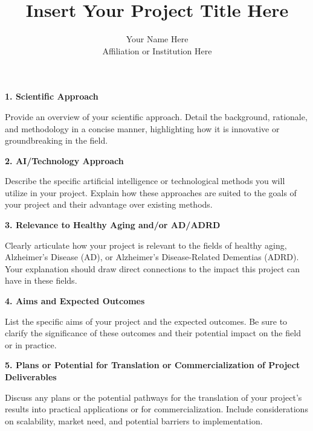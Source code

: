 \documentclass[11pt]{article}
\title{Insert Your Project Title Here}
\author{Your Name Here \\ Affiliation or Institution Here}
\date{}
\begin{document}
\maketitle
\thispagestyle{empty}
\pagestyle{empty}

\noindent \textbf{1. Scientific Approach}

Provide an overview of your scientific approach. Detail the background, rationale, and methodology in a concise manner, highlighting how it is innovative or groundbreaking in the field.

\noindent \textbf{2. AI/Technology Approach}

Describe the specific artificial intelligence or technological methods you will utilize in your project. Explain how these approaches are suited to the goals of your project and their advantage over existing methods.

\noindent \textbf{3. Relevance to Healthy Aging and/or AD/ADRD}

Clearly articulate how your project is relevant to the fields of healthy aging, Alzheimer's Disease (AD), or Alzheimer's Disease-Related Dementias (ADRD). Your explanation should draw direct connections to the impact this project can have in these fields.

\noindent \textbf{4. Aims and Expected Outcomes}

List the specific aims of your project and the expected outcomes. Be sure to clarify the significance of these outcomes and their potential impact on the field or in practice.

\noindent \textbf{5. Plans or Potential for Translation or Commercialization of Project Deliverables}

Discuss any plans or the potential pathways for the translation of your project's results into practical applications or for commercialization. Include considerations on scalability, market need, and potential barriers to implementation.

\begin{spacing}{0.5}
\end{spacing}
\end{document}
